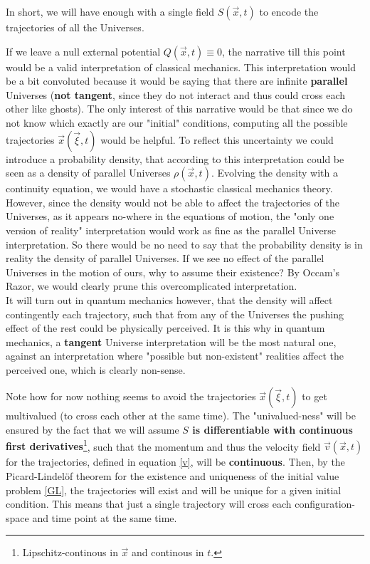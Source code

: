 \documentclass[11pt, a4paper]{article} %
\DeclareRobustCommand{\mybox}[2][gray!10]{%
\begin{tcolorbox}[   %
        left=0.2cm,
        right=0.2cm,
        top=0.15cm,
        bottom=0.15cm,
        colback=#1,
        colframe=#1,
        width=\dimexpr\textwidth\relax, 
        enlarge left by=0mm,
        boxsep=5pt,
        arc=0pt,outer arc=0pt,
        ]
        #2
\end{tcolorbox}
}
\begin{document}
In short, we will have enough with a single field $S(\vec{x},t)$ to encode the trajectories of all the Universes.


\mybox{
If we leave a null external potential $Q(\vec{x},t)\equiv 0$, the narrative till this point would be a valid interpretation of classical mechanics. This interpretation would be a bit convoluted because it would be saying that there are infinite {\bf parallel} Universes ({\bf not tangent}, since they do not interact and thus could cross each other like ghosts). The only interest of this narrative would be that since we do not know which exactly are our "initial" conditions, computing all the possible trajectories $\vec{x}(\vec{\xi},t)$ would be helpful. To reflect this uncertainty we could introduce a probability density, that according to this interpretation could be seen as a density of parallel Universes $\rho(\vec{x},t)$. Evolving the density with a continuity equation, we would have a stochastic classical mechanics theory. \\

However, since the density would not be able to affect the trajectories of the Universes, as it appears no-where in the equations of motion, the "only one version of reality" interpretation would work as fine as the parallel Universe interpretation. So there would be no need to say that the probability density is in reality the density of parallel Universes. If we see no effect of the parallel Universes in the motion of ours, why to assume their existence? By Occam's Razor, we would clearly prune this overcomplicated interpretation.\\

It will turn out in quantum mechanics however, that the density will affect contingently each trajectory, such that from any of the Universes the pushing effect of the rest could be physically perceived. It is this why in quantum mechanics, a {\bf tangent} Universe interpretation will be the most natural one, against an interpretation where "possible but non-existent" realities affect the perceived one, which is clearly non-sense.
}

Note how for now nothing seems to avoid the trajectories $\vec	{x}(\vec{\xi},t)$ to get multivalued (to cross each other at the same time). The "univalued-ness" will be ensured by the fact that we will assume {\bf $S$ is differentiable with continuous first derivatives}\footnote{Lipschitz-continous in $\vec{x}$ and continous in $t$.}, such that the momentum and thus the velocity field $\vec{v}(\vec{x},t)$ for the trajectories, defined in equation \eqref{v}, will be {\bf continuous}. Then, by the Picard-Lindelöf theorem for the existence and uniqueness of the initial value problem \eqref{GL}, the trajectories will exist and will be unique for a given initial condition. This means that just a single trajectory will cross each configuration-space and time point at the same time. 
\end{document}
